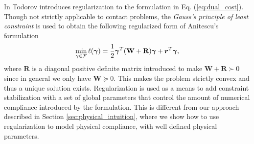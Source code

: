In \cite{bib:todorov2011, bib:todorov2014} Todorov introduces regularization to
the formulation in Eq. (\ref{eq:dual_cost}). Though not strictly applicable to
contact problems, the \emph{Gauss's principle of least constraint} is used to
obtain the following regularized form of Anitescu's formulation
\begin{eqnarray}
	\min_{\gamma\in \mathcal{F}} \ell(\bgamma) =
	\frac{1}{2}\bgamma^T(\mathbf{W}+\mathbf{R})\bgamma + {\bm r}^T
	\bgamma,
	\label{eq:dual_regularized}
\end{eqnarray}
where $\mathbf{R}$ is a diagonal positive definite matrix introduced to make
$\mathbf{W}+\mathbf{R}\succ 0$ since in general we only have $\mathbf{W} \succeq
0$. This makes the problem strictly convex and thus a unique solution exists.
Regularization is used as a means to add constraint
stabilization with a set of global parameters that control the amount of numerical
compliance introduced by the formulation. This is different from our approach
described in Section \ref{sec:physical_intuition}, where we show how to use
regularization to model physical compliance, with well defined physical
parameters.
